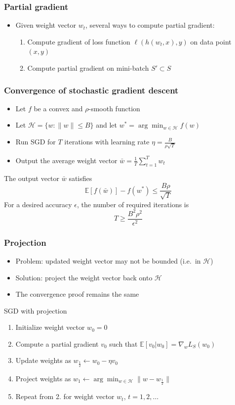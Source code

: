 \documentclass[10pt]{beamer}
\begin{document}
\begin{frame}
  \frametitle{Partial gradient}
  \begin{itemize}
	\item Given weight vector $w_t$, several ways to compute partial gradient:
	\begin{enumerate}
	\item Compute gradient of loss function $\ell(h(w_t,x),y)$ on {\color{red} data point $(x,y)$}
	\item Compute partial gradient on {\color{blue} mini-batch} $S'\subset S$
	\end{enumerate}
  \end{itemize}
\end{frame}

\begin{frame}
  \frametitle{Convergence of stochastic gradient descent}
  \begin{itemize}
	\item Let $f$ be a convex and $\rho$-smooth function
	\item Let $\mathcal{H}=\{w:\lVert w\rVert \leq B\}$ and let $w^* = \arg\min_{w\in\mathcal{H}} f(w)$
	\item Run SGD for $T$ iterations with learning rate $\eta = \frac B {\rho\sqrt{T}}$
	\item Output the {\color{red} average} weight vector $\bar{w}=\frac 1 T \sum_{t=1}^T w_t$
  \end{itemize}
  \pause
  \begin{theorem}
	The output vector $\bar{w}$ satisfies
	\[\mathbb{E}[f(\bar{w})] - f(w^*) \leq \frac {B\rho} {\sqrt{T}}\]
	For a desired accuracy $\epsilon$, the number of required iterations is
	\[T \geq \frac {B^2\rho^2} {\epsilon^2}\]
  \end{theorem}
\end{frame}

\begin{frame}
  \frametitle{Projection}
  \begin{itemize}
	\item Problem: updated weight vector may not be bounded (i.e.~in $\mathcal{H}$)
	\item Solution: {\color{red} project} the weight vector back onto $\mathcal{H}$
	\item The convergence proof remains the same
  \end{itemize}
  \begin{block}{SGD with projection}
  \begin{enumerate}
	\item Initialize weight vector $w_0=0$
	\item Compute a partial gradient $v_0$ such that $\mathbb{E}[v_0|w_0] = \nabla_w L_S(w_0)$
	\item Update weights as $w_{\frac 1 2}\leftarrow w_0 - \eta v_0$
	\item {\color{red} Project} weights as $w_1 \leftarrow \arg\min_{w\in\mathcal{H}} \lVert w - w_{\frac 1 2} \rVert$
	\item Repeat from 2. for weight vector $w_t$, $t=1,2,\ldots$
  \end{enumerate}
  \end{block}
\end{frame}
\end{document}
